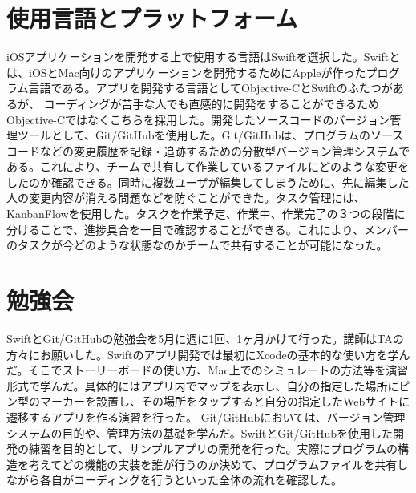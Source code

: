 \section{使用言語とプラットフォーム}

iOSアプリケーションを開発する上で使用する言語はSwiftを選択した。Swiftとは、iOSとMac向けのアプリケーションを開発するためにAppleが作ったプログラム言語である。アプリを開発する言語としてObjective-CとSwiftのふたつがあるが、
コーディングが苦手な人でも直感的に開発をすることができるためObjective-Cではなくこちらを採用した。開発したソースコードのバージョン管理ツールとして、Git/GitHubを使用した。Git/GitHubは、プログラムのソースコードなどの変更履歴を記録・追跡するための分散型バージョン管理システムである。これにより、チームで共有して作業しているファイルにどのような変更をしたのか確認できる。同時に複数ユーザが編集してしまうために、先に編集した人の変更内容が消える問題などを防ぐことができた。タスク管理には、KanbanFlowを使用した。タスクを作業予定、作業中、作業完了の３つの段階に分けることで、進捗具合を一目で確認することができる。これにより、メンバーのタスクが今どのような状態なのかチームで共有することが可能になった。

\section{勉強会}
SwiftとGit/GitHubの勉強会を5月に週に1回、1ヶ月かけて行った。講師はTAの方々にお願いした。Swiftのアプリ開発では最初にXcodeの基本的な使い方を学んだ。そこでストーリーボードの使い方、Mac上でのシミュレートの方法等を演習形式で学んだ。具体的にはアプリ内でマップを表示し、自分の指定した場所にピン型のマーカーを設置し、その場所をタップすると自分の指定したWebサイトに遷移するアプリを作る演習を行った。
Git/GitHubにおいては、バージョン管理システムの目的や、管理方法の基礎を学んだ。SwiftとGit/GitHubを使用した開発の練習を目的として、サンプルアプリの開発を行った。実際にプログラムの構造を考えてどの機能の実装を誰が行うのか決めて、プログラムファイルを共有しながら各自がコーディングを行うといった全体の流れを確認した。

